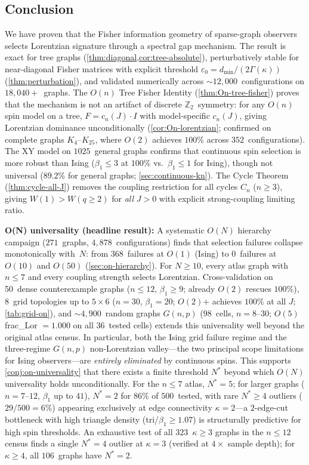 \documentclass[11pt]{article}
\theoremstyle{definition}
\theoremstyle{remark}
\begin{document}
\subsection{Conclusion}

We have proven that the Fisher information geometry of sparse-graph observers
selects Lorentzian signature through a spectral gap mechanism. The result is
exact for tree graphs (\cref{thm:diagonal,cor:tree-absolute}), perturbatively
stable for near-diagonal Fisher matrices with explicit threshold
$\varepsilon_0 = d_{\min}/(2\Gamma(\kappa))$ (\cref{thm:perturbation}), and
validated numerically across $\sim 12{,}000$~configurations on $18{,}040{+}$~graphs.
The $O(n)$ Tree Fisher Identity (\cref{thm:On-tree-fisher}) proves that
the mechanism is not an artifact of discrete $\mathbb{Z}_2$~symmetry:
for any $O(n)$ spin model on a tree, $F = c_n(J) \cdot I$ with
model-specific $c_n(J)$, giving Lorentzian dominance unconditionally
(\cref{cor:On-lorentzian}; confirmed on complete graphs $K_4$--$K_{25}$,
where $O(2)$ achieves $100\%$ across $352$~configurations).
The XY model on $1025$~general graphs confirms that continuous spin
selection is more robust than Ising ($\beta_1 \leq 3$ at $100\%$ vs.\ $\beta_1
\leq 1$ for Ising), though not universal ($89.2\%$ for general graphs;
\cref{sec:continuous-kn}).
The Cycle Theorem (\cref{thm:cycle-all-J}) removes the coupling
restriction for all cycles $C_n$ ($n \geq 3$), giving $W(1) > W(q \geq 2)$
for \emph{all} $J > 0$ with explicit strong-coupling limiting ratio.

\textbf{O(N) universality (headline result):}
A systematic $O(N)$ hierarchy campaign ($271$~graphs, $4{,}878$~configurations)
finds that selection failures collapse monotonically with~$N$: from
$368$~failures at $O(1)$ (Ising) to $0$~failures at $O(10)$ and $O(50)$
(\cref{sec:on-hierarchy}). For $N \geq 10$, every atlas graph with $n \leq 7$
and every coupling strength selects Lorentzian. Cross-validation on
50~dense counterexample graphs ($n \leq 12$, $\beta_1 \geq 9$; already
$O(2)$ rescues $100\%$), 8~grid topologies up to $5 \times 6$
($n = 30$, $\beta_1 = 20$; $O(2)$+ achieves $100\%$ at all $J$;
\cref{tab:grid-on}), and ${\sim}4{,}900$~random graphs $G(n,p)$
($98$~cells, $n = 8$--$30$; $O(5)$ frac\_Lor $= 1.000$ on all
$36$~tested cells) extends this universality well beyond the
original atlas census. In particular, both
the Ising grid failure regime and the three-regime $G(n,p)$
non-Lorentzian valley---the two principal scope limitations for Ising
observers---are \emph{entirely eliminated} by continuous spins. This supports
\cref{conj:on-universality} that there exists a finite threshold $N^*$ beyond
which $O(N)$ universality holds unconditionally. For the $n \leq 7$ atlas,
$N^* = 5$; for larger graphs ($n = 7$--$12$, $\beta_1$ up to $41$),
$N^* = 2$ for $86\%$ of $500$~tested, with rare $N^* \geq 4$ outliers
($29/500 = 6\%$) appearing exclusively at edge connectivity $\kappa = 2$---a
$2$-edge-cut bottleneck with high triangle density (tri/$\beta_1 \geq 1.07$)
is structurally predictive for high spin thresholds. An exhaustive test of
all $323$~$\kappa \geq 3$ graphs in the $n \leq 12$ census finds a single
$N^* = 4$ outlier at $\kappa = 3$ (verified at $4\times$ sample depth);
for $\kappa \geq 4$, all $106$~graphs have $N^* = 2$.
\end{document}
